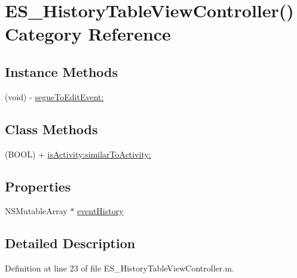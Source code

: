\hypertarget{category_e_s___history_table_view_controller_07_08}{\section{E\+S\+\_\+\+History\+Table\+View\+Controller() Category Reference}
\label{category_e_s___history_table_view_controller_07_08}
}
\subsection*{Instance Methods}
\begin{DoxyCompactItemize}
\item 
(void) -\/ \hyperlink{category_e_s___history_table_view_controller_07_08_a8a4b2bef591f3410c8d763d45c9e5599}{segue\+To\+Edit\+Event\+:}
\end{DoxyCompactItemize}
\subsection*{Class Methods}
\begin{DoxyCompactItemize}
\item 
(B\+O\+O\+L) + \hyperlink{category_e_s___history_table_view_controller_07_08_aa652cd81563eed577cc059001afac07f}{is\+Activity\+:similar\+To\+Activity\+:}
\end{DoxyCompactItemize}
\subsection*{Properties}
\begin{DoxyCompactItemize}
\item 
N\+S\+Mutable\+Array $\ast$ \hyperlink{category_e_s___history_table_view_controller_07_08_ace18d1966c96e263a533643a0fedf012}{event\+History}
\end{DoxyCompactItemize}


\subsection{Detailed Description}


Definition at line 23 of file E\+S\+\_\+\+History\+Table\+View\+Controller.\+m.



